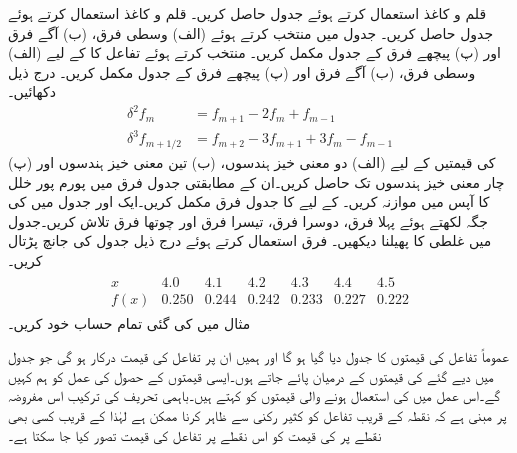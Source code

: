 
\quad
قلم و کاغذ استعمال کرتے ہوئے جدول  حاصل کریں۔
\quad
قلم و کاغذ استعمال کرتے ہوئے جدول  حاصل کریں۔
\quad
جدول  میں  منتخب کرتے ہوئے (الف) وسطی فرق، (ب) آگے فرق اور (پ) پیچھے فرق کے جدول مکمل کریں۔
\quad
{} منتخب کرتے ہوئے تفاعل  کا  کے لیے   (الف) وسطی فرق، (ب) آگے فرق اور (پ) پیچھے فرق کے جدول مکمل کریں۔
\quad
درج ذیل دکھائیں۔
\begin{align*}
\delta^2 f_m&=f_{m+1}-2f_m+f_{m-1}\\
\delta^3 f_{m+1/2}&=f_{m+2}-3f_{m+1}+3f_m-f_{m-1}
\end{align*}
\quad
{} کی قیمتیں  کے لیے (الف) دو معنی خیز ہندسوں، (ب) تین معنی خیز ہندسوں اور (پ) چار معنی خیز ہندسوں تک حاصل کریں۔ان کے مطابقتی جدول فرق میں پورم پور خلل کا آپس میں موازنہ کریں۔ 
\quad
{} کے لیے  کا جدول فرق مکمل کریں۔ایک اور جدول میں  کی جگہ  لکھتے ہوئے پہلا فرق، دوسرا فرق، تیسرا فرق اور چوتھا فرق تلاش کریں۔جدول میں غلطی کا پھیلنا دیکھیں۔  
\quad
فرق استعمال کرتے ہوئے درج ذیل جدول کی جانچ پڑتال کریں۔
\begin{align*}
\begin{array}{c|cccccc}
x&4.0&4.1&4.2&4.3&4.4&4.5\\
\hline
f(x)&0.250&0.244&0.242&0.233&0.227&0.222
\end{array}
\end{align*}
\quad
مثال  میں کی گئی  تمام حساب خود کریں۔  

عموماً تفاعل  کی قیمتوں کا جدول دیا گیا ہو گا اور ہمیں ان  پر تفاعل کی قیمت درکار ہو گی جو جدول میں دیے گئے  کی قیمتوں کے درمیان پائے جاتے ہوں۔ایسی قیمتوں کے حصول کی عمل کو ہم  کہیں گے۔اس عمل میں  کی استعمال ہونے والی قیمتوں کو  کہتے ہیں۔باہمی تحریف کی ترکیب اس مفروضہ پر مبنی ہے کہ نقطہ  کے قریب تفاعل  کو کثیر رکنی  سے ظاہر کرنا ممکن ہے لہٰذا  کے قریب کسی بھی نقطے پر  کی قیمت کو اس نقطے پر تفاعل کی قیمت تصور کیا جا سکتا ہے۔

